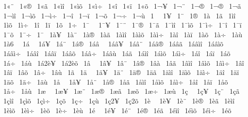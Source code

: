 {^^a01^^ab^^a8
^^a01^^ab^^ae
^^a01^^ab^^e3
^^a01^^ab^^ec^^ee
^^a01^^ab^^ec^^f5
^^a01^^ab^^ec^^f7
^^a01^^ab^^ee
^^a01^^ab^^ef
^^a01^^ab^^f5
^^a01^^ac^^a5
^^a01^^ac^^a8
^^a01^^ac^^ad^^ae
^^a01^^ac^^ae
^^a01^^ac^^e3
^^a01^^ac^^ec^^ee
^^a01^^ac^^ec^^f5
^^a01^^ac^^ec^^f7
^^a01^^ac^^ee
^^a01^^ac^^ef
^^a01^^ac^^f5
^^a01^^ac^^f7
^^a01^^ac^^f9
^^a01^^ad^^a0
^^a01^^ad^^a5
^^a01^^ad^^a8
^^a01^^ad^^ae
^^a01^^ad^^e0
^^a01^^ad^^e3
^^a01^^ad^^ec^^ee
^^a01^^ad^^ec^^f5
^^a01^^ad^^ec^^f7
^^a01^^ad^^ee
^^a01^^ad^^ef
^^a01^^ad^^f5
^^a01^^ad^^f7
^^a01^^af^^a0
^^a01^^af^^a5
^^a01^^af^^a8
^^a01^^af^^ae
^^a01^^af^^e3
^^a01^^af^^ec^^ee
^^a01^^af^^ec^^f5
^^a01^^af^^ec^^f7
^^a01^^af^^ee
^^a01^^af^^ef
^^a01^^af^^f5
^^a01^^af^^f7
^^a01^^af
^^a01^^e0^^a5
^^a01^^e0^^a8
^^a01^^e0^^ae
^^a01^^e0^^e3
^^a01^^e0^^ec^^ee
^^a01^^e0^^ec^^f5
^^a01^^e0^^ec^^f7
^^a01^^e0^^ee
^^a01^^e0^^ef
^^a01^^e0^^f5
^^a01^^e0^^f7
^^a01^^e0^^f9
^^a01^^e06^^a0
^^a01^^e1^^a0
^^a01^^e1^^a5
^^a01^^e1^^a8
^^a01^^e1^^ae
^^a01^^e1^^e2^^a0
^^a01^^e1^^e2^^a5
^^a01^^e1^^e2^^a8
^^a01^^e1^^e2^^ae
^^a01^^e1^^e2^^e3
^^a01^^e1^^e2^^ec^^ee
^^a01^^e1^^e2^^ec^^f5
^^a01^^e1^^e2^^ec^^f7
^^a01^^e1^^e2^^ee
^^a01^^e1^^e2^^ef
^^a01^^e1^^e2^^f5
^^a01^^e1^^e2^^f7
^^a01^^e1^^e2^^f9
^^a01^^e1^^e3
^^a01^^e1^^ec^^ee
^^a01^^e1^^ec^^f5
^^a01^^e1^^ec^^f7
^^a01^^e1^^ee
^^a01^^e1^^ef
^^a01^^e1^^f5
^^a01^^e1^^f7
^^a01^^e1^^f9
^^a01^^e12^^e8^^a5
^^a01^^e12^^e8^^f5
^^a01^^e2^^a0
^^a01^^e2^^a5
^^a01^^e2^^a8
^^a01^^e2^^ae
^^a01^^e2^^e0
^^a01^^e2^^e3
^^a01^^e2^^ec^^ee
^^a01^^e2^^ec^^f5
^^a01^^e2^^ec^^f7
^^a01^^e2^^ee
^^a01^^e2^^ef
^^a01^^e2^^f5
^^a01^^e2^^f7
^^a01^^e2^^f9
^^a01^^e3
^^a01^^e4^^a0
^^a01^^e4^^a5
^^a01^^e4^^a8
^^a01^^e4^^ae
^^a01^^e4^^e3
^^a01^^e4^^ec^^ee
^^a01^^e4^^ec^^f5
^^a01^^e4^^ec^^f7
^^a01^^e4^^ee
^^a01^^e4^^ef
^^a01^^e4^^f5
^^a01^^e4^^f7
^^a01^^e4^^f9
^^a01^^e5^^a0
^^a01^^e5^^a5
^^a01^^e5^^a8
^^a01^^e5^^ae
^^a01^^e5^^e3
^^a01^^e5^^ec^^ee
^^a01^^e5^^ec^^f5
^^a01^^e5^^ec^^f7
^^a01^^e5^^ee
^^a01^^e5^^ef
^^a01^^e5^^f5
^^a01^^e5^^f7
^^a01^^e5^^f9
^^a01^^e6^^a0
^^a01^^e6^^a5
^^a01^^e6^^a8
^^a01^^e6^^ae
^^a01^^e6^^e3
^^a01^^e6^^f5
^^a01^^e6^^f7
^^a01^^e6^^f9
^^a01^^e7^^a0
^^a01^^e7^^a5
^^a01^^e7^^a8
^^a01^^e7^^e3
^^a01^^e7^^ec^^ee
^^a01^^e7^^ec^^f5
^^a01^^e7^^ec^^f7
^^a01^^e7^^f5
^^a01^^e7^^f7
^^a01^^e7^^f9
^^a01^^e72^^ad^^a5
^^a01^^e72^^ad^^f5
^^a01^^e8^^a0
^^a01^^e8^^a5
^^a01^^e8^^a8
^^a01^^e8^^ae
^^a01^^e8^^e3
^^a01^^e8^^ec^^ee
^^a01^^e8^^ec^^f5
^^a01^^e8^^ec^^f7
^^a01^^e8^^f5
^^a01^^e8^^f7
^^a01^^e8^^f9
^^a01^^e9^^a0
^^a01^^e9^^a5
^^a01^^e9^^a8
^^a01^^e9^^ae
^^a01^^e9^^e3
^^a01^^e9^^ec^^ee
^^a01^^e9^^ec^^f5
^^a01^^e9^^ec^^f7
^^a01^^e9^^f5
}
